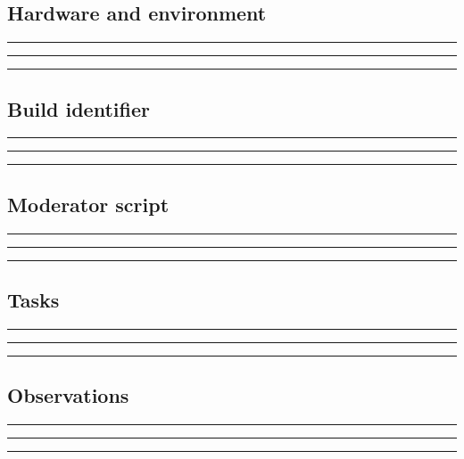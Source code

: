 \documentclass[11pt]{article}
\begin{document}
\subsection{Hardware and environment}
\noindent\rule{\linewidth}{0.3pt}\par\vspace{0.18in}
\noindent\rule{\linewidth}{0.3pt}\par\vspace{0.18in}
\noindent\rule{\linewidth}{0.3pt}\par\vspace{0.14in}

\subsection{Build identifier}
\noindent\rule{\linewidth}{0.3pt}\par\vspace{0.18in}
\noindent\rule{\linewidth}{0.3pt}\par\vspace{0.18in}
\noindent\rule{\linewidth}{0.3pt}\par\vspace{0.14in}

\subsection{Moderator script}
\noindent\rule{\linewidth}{0.3pt}\par\vspace{0.18in}
\noindent\rule{\linewidth}{0.3pt}\par\vspace{0.18in}
\noindent\rule{\linewidth}{0.3pt}\par\vspace{0.14in}

\subsection{Tasks}
\noindent\rule{\linewidth}{0.3pt}\par\vspace{0.18in}
\noindent\rule{\linewidth}{0.3pt}\par\vspace{0.18in}
\noindent\rule{\linewidth}{0.3pt}\par\vspace{0.14in}

\subsection{Observations}
\noindent\rule{\linewidth}{0.3pt}\par\vspace{0.18in}
\noindent\rule{\linewidth}{0.3pt}\par\vspace{0.18in}
\noindent\rule{\linewidth}{0.3pt}\par\vspace{0.14in}
\end{document}
